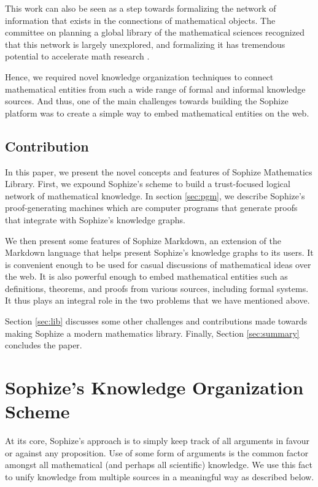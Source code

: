 \documentclass[runningheads]{llncs}
\begin{document}
This work can also be seen as a step towards formalizing the network of information that exists in the connections of mathematical objects. The committee on planning a global library of the mathematical sciences recognized that this network is largely unexplored, and formalizing it has tremendous potential to accelerate math research \cite{sciences2014developing}.

Hence, we required novel knowledge organization techniques to connect mathematical entities from such a wide range of formal and informal knowledge sources. And thus, one of the main challenges towards building the Sophize platform was to create a simple way to embed mathematical entities on the web.

\subsection*{Contribution}
In this paper, we present the novel concepts and features of Sophize Mathematics Library. First, we expound Sophize's scheme to build a trust-focused logical network of mathematical knowledge. In section \ref{sec:pgm}, we describe Sophize's proof-generating machines which are computer programs that generate proofs that integrate with Sophize's knowledge graphs.

We then present some features of Sophize Markdown, an extension of the Markdown language that helps present Sophize's knowledge graphs to its users. It is convenient enough to be used for casual discussions of mathematical ideas over the web. It is also powerful enough to embed mathematical entities such as definitions, theorems, and proofs from various sources, including formal systems. It thus plays an integral role in the two problems that we have mentioned above.

Section \ref{sec:lib} discusses some other challenges and contributions made towards making Sophize a modern mathematics library. Finally, Section \ref{sec:summary} concludes the paper.


\section{Sophize's Knowledge Organization Scheme}
At its core, Sophize's approach is to simply keep track of all arguments in favour or against any proposition. Use of some form of arguments is the common factor amongst all mathematical (and perhaps all scientific) knowledge. We use this fact to unify knowledge from multiple sources in a meaningful way as described below.
\end{document}
